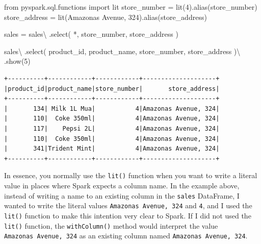 \documentclass[
  11pt,
  letterpaper,
  DIV=11,
  numbers=noendperiod]{scrreprt}
\newenvironment{Shaded}{\begin{snugshade}}{\end{snugshade}}
\newcommand{\DecValTok}[1]{\textcolor[rgb]{0.68,0.00,0.00}{#1}}
\newcommand{\ImportTok}[1]{\textcolor[rgb]{0.00,0.46,0.62}{#1}}
\newcommand{\NormalTok}[1]{\textcolor[rgb]{0.00,0.23,0.31}{#1}}
\newcommand{\OperatorTok}[1]{\textcolor[rgb]{0.37,0.37,0.37}{#1}}
\newcommand{\StringTok}[1]{\textcolor[rgb]{0.13,0.47,0.30}{#1}}
\begin{document}
\begin{Shaded}
\begin{Highlighting}[]
\ImportTok{from}\NormalTok{ pyspark.sql.functions }\ImportTok{import}\NormalTok{ lit}
\NormalTok{store\_number }\OperatorTok{=}\NormalTok{ lit(}\DecValTok{4}\NormalTok{).alias(}\StringTok{\textquotesingle{}store\_number\textquotesingle{}}\NormalTok{)}
\NormalTok{store\_address }\OperatorTok{=}\NormalTok{ lit(}\StringTok{\textquotesingle{}Amazonas Avenue, 324\textquotesingle{}}\NormalTok{).alias(}\StringTok{\textquotesingle{}store\_address\textquotesingle{}}\NormalTok{)}

\NormalTok{sales }\OperatorTok{=}\NormalTok{ sales}\OperatorTok{\textbackslash{}}
\NormalTok{    .select(}
        \StringTok{\textquotesingle{}*\textquotesingle{}}\NormalTok{, store\_number, store\_address}
\NormalTok{    )}

\NormalTok{sales}\OperatorTok{\textbackslash{}}
\NormalTok{    .select(}
        \StringTok{\textquotesingle{}product\_id\textquotesingle{}}\NormalTok{, }\StringTok{\textquotesingle{}product\_name\textquotesingle{}}\NormalTok{,}
        \StringTok{\textquotesingle{}store\_number\textquotesingle{}}\NormalTok{, }\StringTok{\textquotesingle{}store\_address\textquotesingle{}}
\NormalTok{    )}\OperatorTok{\textbackslash{}}
\NormalTok{    .show(}\DecValTok{5}\NormalTok{)}
\end{Highlighting}
\end{Shaded}

\begin{verbatim}
+----------+------------+------------+--------------------+
|product_id|product_name|store_number|       store_address|
+----------+------------+------------+--------------------+
|       134| Milk 1L Mua|           4|Amazonas Avenue, 324|
|       110|  Coke 350ml|           4|Amazonas Avenue, 324|
|       117|    Pepsi 2L|           4|Amazonas Avenue, 324|
|       110|  Coke 350ml|           4|Amazonas Avenue, 324|
|       341|Trident Mint|           4|Amazonas Avenue, 324|
+----------+------------+------------+--------------------+
\end{verbatim}

In essence, you normally use the \texttt{lit()} function when you want
to write a literal value in places where Spark expects a column name. In
the example above, instead of writing a name to an existing column in
the \texttt{sales} DataFrame, I wanted to write the literal values
\texttt{\textquotesingle{}Amazonas\ Avenue,\ 324\textquotesingle{}} and
\texttt{4}, and I used the \texttt{lit()} function to make this
intention very clear to Spark. If I did not used the \texttt{lit()}
function, the \texttt{withColumn()} method would interpret the value
\texttt{\textquotesingle{}Amazonas\ Avenue,\ 324\textquotesingle{}} as
an existing column named \texttt{Amazonas\ Avenue,\ 324}.
\end{document}
